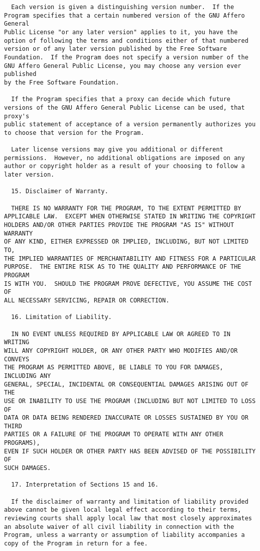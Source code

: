 \documentclass[11pt]{article}
\begin{document}
\begin{verbatim}
  Each version is given a distinguishing version number.  If the
Program specifies that a certain numbered version of the GNU Affero General
Public License "or any later version" applies to it, you have the
option of following the terms and conditions either of that numbered
version or of any later version published by the Free Software
Foundation.  If the Program does not specify a version number of the
GNU Affero General Public License, you may choose any version ever published
by the Free Software Foundation.

  If the Program specifies that a proxy can decide which future
versions of the GNU Affero General Public License can be used, that proxy's
public statement of acceptance of a version permanently authorizes you
to choose that version for the Program.

  Later license versions may give you additional or different
permissions.  However, no additional obligations are imposed on any
author or copyright holder as a result of your choosing to follow a
later version.

  15. Disclaimer of Warranty.

  THERE IS NO WARRANTY FOR THE PROGRAM, TO THE EXTENT PERMITTED BY
APPLICABLE LAW.  EXCEPT WHEN OTHERWISE STATED IN WRITING THE COPYRIGHT
HOLDERS AND/OR OTHER PARTIES PROVIDE THE PROGRAM "AS IS" WITHOUT WARRANTY
OF ANY KIND, EITHER EXPRESSED OR IMPLIED, INCLUDING, BUT NOT LIMITED TO,
THE IMPLIED WARRANTIES OF MERCHANTABILITY AND FITNESS FOR A PARTICULAR
PURPOSE.  THE ENTIRE RISK AS TO THE QUALITY AND PERFORMANCE OF THE PROGRAM
IS WITH YOU.  SHOULD THE PROGRAM PROVE DEFECTIVE, YOU ASSUME THE COST OF
ALL NECESSARY SERVICING, REPAIR OR CORRECTION.

  16. Limitation of Liability.

  IN NO EVENT UNLESS REQUIRED BY APPLICABLE LAW OR AGREED TO IN WRITING
WILL ANY COPYRIGHT HOLDER, OR ANY OTHER PARTY WHO MODIFIES AND/OR CONVEYS
THE PROGRAM AS PERMITTED ABOVE, BE LIABLE TO YOU FOR DAMAGES, INCLUDING ANY
GENERAL, SPECIAL, INCIDENTAL OR CONSEQUENTIAL DAMAGES ARISING OUT OF THE
USE OR INABILITY TO USE THE PROGRAM (INCLUDING BUT NOT LIMITED TO LOSS OF
DATA OR DATA BEING RENDERED INACCURATE OR LOSSES SUSTAINED BY YOU OR THIRD
PARTIES OR A FAILURE OF THE PROGRAM TO OPERATE WITH ANY OTHER PROGRAMS),
EVEN IF SUCH HOLDER OR OTHER PARTY HAS BEEN ADVISED OF THE POSSIBILITY OF
SUCH DAMAGES.

  17. Interpretation of Sections 15 and 16.

  If the disclaimer of warranty and limitation of liability provided
above cannot be given local legal effect according to their terms,
reviewing courts shall apply local law that most closely approximates
an absolute waiver of all civil liability in connection with the
Program, unless a warranty or assumption of liability accompanies a
copy of the Program in return for a fee.


\end{verbatim}
\end{document}
